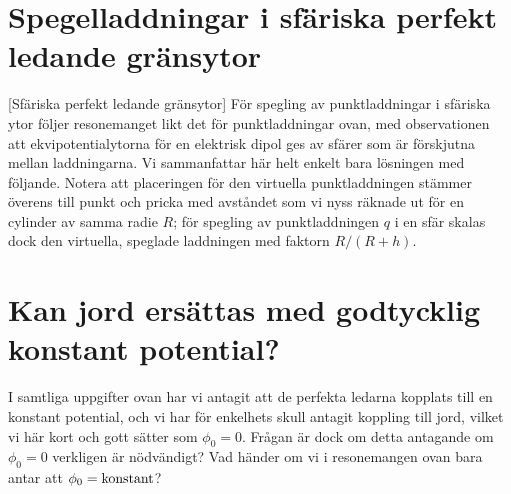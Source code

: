 {{\section{Spegelladdningar i sf{\"a}riska perfekt ledande gr{\"a}nsytor}
[Sf{\"a}riska perfekt ledande gr{\"a}nsytor]
F{\"o}r spegling av punktladdningar i sf{\"a}riska ytor f{\"o}ljer resonemanget
likt det f{\"o}r punktladdningar ovan, med observationen att ekvipotentialytorna
f{\"o}r en elektrisk dipol ges av sf{\"a}rer som {\"a}r f{\"o}r\-skjutna mellan
laddningarna.
Vi sammanfattar h{\"a}r helt enkelt bara l{\"o}sningen med f{\"o}ljande.
\noindent
Notera att placeringen f{\"o}r den virtuella punktladdningen st{\"a}mmer
{\"o}verens till punkt och pricka med avst{\aa}ndet som vi nyss r{\"a}knade
ut f{\"o}r en cylinder av samma radie $R$; f{\"o}r spegling av punktladdningen
$q$ i en sf{\"a}r skalas dock den virtuella, speglade laddningen med faktorn
$R/(R+h)$.

\section{Kan jord ers{\"a}ttas med godtycklig konstant potential?}
I samtliga uppgifter ovan har vi antagit att de perfekta ledarna kopplats till
en konstant potential, och vi har f{\"o}r enkelhets skull antagit koppling till
jord, vilket vi h{\"a}r kort och gott s{\"a}tter som $\phi_0=0$.
Fr{\aa}gan {\"a}r dock om detta antagande om $\phi_0=0$ verkligen {\"a}r
n{\"o}dv{\"a}ndigt? Vad h{\"a}nder om vi i resonemangen ovan bara antar att
$\phi_0=\hbox{konstant}$?
\vfill\eject

}}
